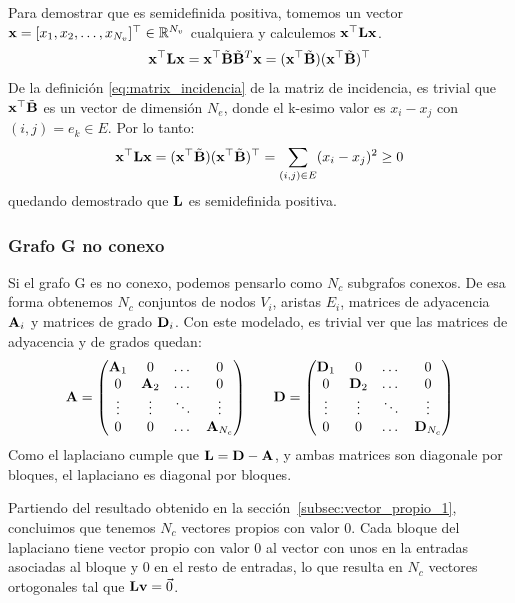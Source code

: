 \documentclass{article}
\begin{document}
Para demostrar que es semidefinida positiva, tomemos un vector $\mathbf{x} = [x_1, x_2, \dots, x_{N_v}]^\top \in \mathbb{R}^{N_v}$
cualquiera y calculemos $\mathbf{x}^\top\mathbf{L}\mathbf{x}$.
\begin{equation*}
    \mathbf{x}^\top\mathbf{L}\mathbf{x} = \mathbf{x}^\top \tilde{\mathbf{B}}\tilde{\mathbf{B}}^T\mathbf{x} = (\mathbf{x}^\top\tilde{\mathbf{B}})(\mathbf{x}^\top\tilde{\mathbf{B}})^\top
\end{equation*}
De la definición \eqref{eq:matrix_incidencia} de la matriz de incidencia, es trivial que $\mathbf{x}^\top \tilde{\mathbf{B}}$ es un vector de dimensión $N_e$, donde el k-esimo valor es $x_i-x_j$ con $(i,j) = e_k \in E$.  Por lo tanto:
\begin{equation}
    \mathbf{x}^\top\mathbf{L}\mathbf{x} = (\mathbf{x}^\top\tilde{\mathbf{B}})(\mathbf{x}^\top\tilde{\mathbf{B}})^\top = \sum_{(i,j)\in E} (x_i-x_j)^2 \geq 0
\end{equation}
quedando demostrado que $\mathbf{L}$ es semidefinida positiva.

\subsubsection{Grafo G no conexo}

Si el grafo G es no conexo, podemos pensarlo como $N_c$ subgrafos conexos. De esa forma
obtenemos $N_c$ conjuntos de nodos $V_i$, aristas $E_i$, matrices de adyacencia $\mathbf{A}_i$ y matrices de grado $\mathbf{D}_i$. Con este modelado, es trivial ver que las matrices de adyacencia y de grados quedan:
\begin{equation*}
    \begin{array}{l c r}
        \mathbf{A} = \left(\begin{matrix}
                             \mathbf{A}_1 & 0      & \dots  & 0          \\
                             0      & \mathbf{A}_2 & \dots  & 0          \\
                             \vdots & \vdots & \ddots & \vdots     \\
                             0      & 0      & \dots  & \mathbf{A}_{N_c}
                         \end{matrix}\right)
         &  &
        \mathbf{D} =\left(\begin{matrix}
                             \mathbf{D}_1 & 0       & \dots  & 0           \\
                             0       & \mathbf{D}_2 & \dots  & 0           \\
                             \vdots  & \vdots  & \ddots & \vdots      \\
                             0       & 0       & \dots  & \mathbf{D}_{N_c}
                         \end{matrix}\right)
    \end{array}
\end{equation*}
Como el laplaciano cumple que $\mathbf{L} = \mathbf{D} - \mathbf{A}$, y ambas matrices son diagonale por bloques, el laplaciano es diagonal por bloques.

Partiendo del resultado obtenido en la sección~\ref{subsec:vector_propio_1}, concluimos que tenemos $N_c$ vectores propios con valor 0. Cada bloque del laplaciano tiene vector propio con valor 0 al vector con unos en la entradas asociadas al bloque y 0 en el resto de entradas, lo que resulta en $N_c$ vectores ortogonales tal que $\mathbf{L} \mathbf{v} = \vec{0}$.
\end{document}
